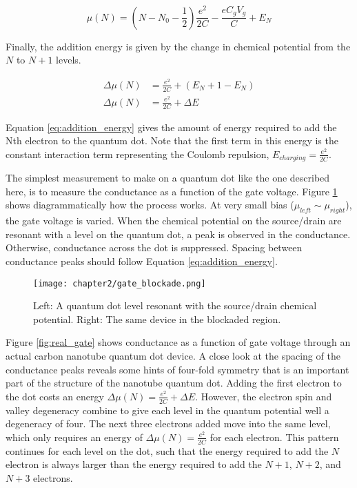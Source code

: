 \begin{equation}
    \mu(N) = (N - N_0 - \frac{1}{2})\frac{e^2}{2C} - \frac{eC_gV_g}{C} + E_N
\end{equation}

Finally, the addition energy is given by the change in chemical potential from the $N$ to $N+1$ levels.

\begin{align}
    \Delta \mu(N) &= \frac{e^2}{2C} + (E_N+1 - E_N) \nonumber \\
    \Delta \mu(N) &= \frac{e^2}{2C} + \Delta E  \label{eq:addition_energy}
\end{align}

Equation \ref{eq:addition_energy} gives the amount of energy required to add the Nth electron to the quantum dot. Note that the first term in this energy is the constant interaction term representing the Coulomb repulsion, $E_{charging} = \frac{e^2}{2C}$. 

The simplest measurement to make on a quantum dot like the one described here, is to measure the conductance as a function of the gate voltage. Figure \ref{fig:gate_blockade} shows diagrammatically how the process works. At very small bias ($\mu_{left} \sim \mu_{right}$), the gate voltage is varied. When the chemical potential on the source/drain are resonant with a level on the quantum dot, a peak is observed in the conductance. Otherwise, conductance  across the dot is suppressed. Spacing between conductance peaks should follow Equation \ref{eq:addition_energy}.

\begin{figure}
    \centering
    \texttt{[image: chapter2/gate\_blockade.png]}
    \caption{Left: A quantum dot level resonant with the source/drain chemical potential. Right: The same device in the blockaded region.}
    \label{fig:gate_blockade}
\end{figure}

Figure \ref{fig:real_gate} shows conductance as a function of gate voltage through an actual carbon nanotube quantum dot device. A close look at the spacing of the conductance peaks reveals some hints of four-fold symmetry that is an important part of the structure of the nanotube quantum dot. Adding the first electron to the dot costs an energy $ \Delta \mu(N) = \frac{e^2}{2C} + \Delta E$. However, the electron spin and valley degeneracy combine to give each level in the quantum potential well a degeneracy of four. The next three electrons added move into the same level, which only requires an energy of $\Delta \mu(N) = \frac{e^2}{2C}$ for each electron. This pattern continues for each level on the dot, such that the energy required to add the $N$ electron is always larger than the energy required to add the $N+1$, $N+2$, and $N+3$ electrons.

